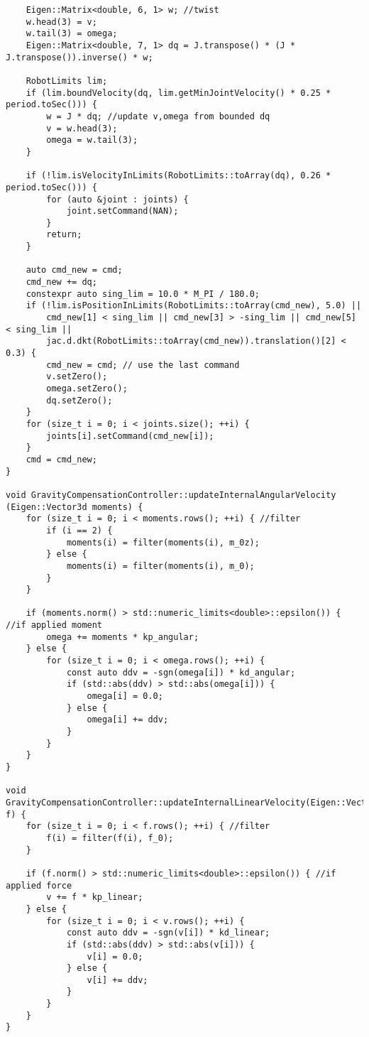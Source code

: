 \begin{lstlisting}
    Eigen::Matrix<double, 6, 1> w; //twist
    w.head(3) = v;
    w.tail(3) = omega;
    Eigen::Matrix<double, 7, 1> dq = J.transpose() * (J * J.transpose()).inverse() * w;

    RobotLimits lim;
    if (lim.boundVelocity(dq, lim.getMinJointVelocity() * 0.25 * period.toSec())) {
        w = J * dq; //update v,omega from bounded dq
        v = w.head(3);
        omega = w.tail(3);
    }

    if (!lim.isVelocityInLimits(RobotLimits::toArray(dq), 0.26 * period.toSec())) {
        for (auto &joint : joints) { 
            joint.setCommand(NAN);
        }
        return;
    }

    auto cmd_new = cmd;
    cmd_new += dq;
    constexpr auto sing_lim = 10.0 * M_PI / 180.0;
    if (!lim.isPositionInLimits(RobotLimits::toArray(cmd_new), 5.0) ||
        cmd_new[1] < sing_lim || cmd_new[3] > -sing_lim || cmd_new[5] < sing_lim ||
        jac.d.dkt(RobotLimits::toArray(cmd_new)).translation()[2] < 0.3) {
        cmd_new = cmd; // use the last command
        v.setZero();
        omega.setZero();
        dq.setZero();
    }
    for (size_t i = 0; i < joints.size(); ++i) {
        joints[i].setCommand(cmd_new[i]);
    }
    cmd = cmd_new;
}

void GravityCompensationController::updateInternalAngularVelocity
(Eigen::Vector3d moments) {
    for (size_t i = 0; i < moments.rows(); ++i) { //filter
        if (i == 2) {
            moments(i) = filter(moments(i), m_0z);
        } else {
            moments(i) = filter(moments(i), m_0);
        }
    }

    if (moments.norm() > std::numeric_limits<double>::epsilon()) { //if applied moment
        omega += moments * kp_angular;
    } else {
        for (size_t i = 0; i < omega.rows(); ++i) { 
            const auto ddv = -sgn(omega[i]) * kd_angular;
            if (std::abs(ddv) > std::abs(omega[i])) {
                omega[i] = 0.0;
            } else {
                omega[i] += ddv;
            }
        }
    }
}

void GravityCompensationController::updateInternalLinearVelocity(Eigen::Vector3d f) {
    for (size_t i = 0; i < f.rows(); ++i) { //filter
        f(i) = filter(f(i), f_0);
    }

    if (f.norm() > std::numeric_limits<double>::epsilon()) { //if applied force
        v += f * kp_linear;
    } else {
        for (size_t i = 0; i < v.rows(); ++i) { 
            const auto ddv = -sgn(v[i]) * kd_linear;
            if (std::abs(ddv) > std::abs(v[i])) {
                v[i] = 0.0;
            } else {
                v[i] += ddv;
            }
        }
    }
}


\end{lstlisting}
